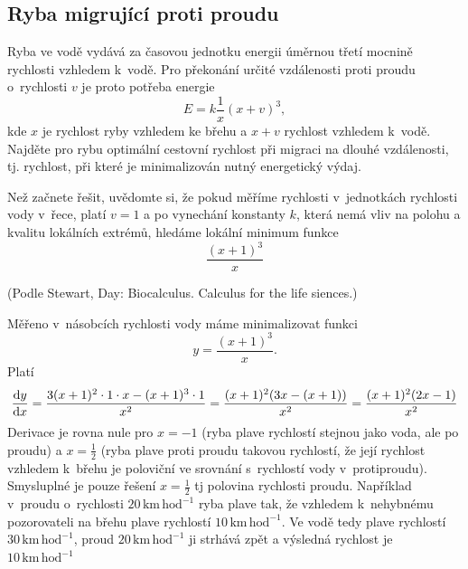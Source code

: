 {
\def\mezera{\vspace*{-20pt}}  \subsection{Ryba
  migrující proti proudu}  Ryba ve vodě vydává za časovou jednotku
energii úměrnou třetí mocnině rychlosti vzhledem k vodě. Pro překonání
určité vzdálenosti proti proudu o rychlosti $v$ je proto potřeba
energie $$E= k \frac 1x (x+v)^3,$$ kde $x$ je rychlost ryby vzhledem
ke břehu a $x+v$ rychlost vzhledem k vodě. Najděte pro rybu optimální
cestovní rychlost při migraci na dlouhé vzdálenosti, tj. rychlost, při
které je minimalizován nutný energetický výdaj.

{\footnotesize

Než začnete řešit, uvědomte si, že pokud měříme rychlosti v jednotkách rychlosti vody v řece, platí $v=1$ a po vynechání konstanty $k$, která nemá vliv na polohu a kvalitu lokálních extrémů, hledáme lokální minimum funkce
\begin{equation*}
  \frac{(x+1)^3}x
\end{equation*}

(Podle Stewart, Day: Biocalculus. Calculus for the life siences.)

}

\reseni
Měřeno v násobcích rychlosti vody máme minimalizovat funkci
\begin{equation*}
  y=\frac{(x+1)^3}x.
\end{equation*}
Platí
\begin{equation*}
  \frac{\mathrm{d}y}{\mathrm{d}x}=\frac{3(x+1)^2\cdot 1\cdot x-(x+1)^3\cdot 1}{x^2}=\frac{(x+1)^2(3x-(x+1))}{x^2}=\frac{(x+1)^2(2x-1)}{x^2}
\end{equation*}
Derivace je rovna nule pro $x=-1$ (ryba plave rychlostí stejnou jako voda, ale po proudu) a $x=\frac 12$ (ryba plave proti proudu takovou rychlostí, že její rychlost vzhledem k břehu je poloviční ve srovnání s rychlostí vody v protiproudu). Smysluplné je pouze řešení $x=\frac 12$ tj polovina rychlosti proudu. Například v proudu o rychlosti $20\,\mathrm{km}\,\mathrm{hod}^{-1}$ ryba plave tak, že vzhledem k nehybnému pozorovateli na břehu plave rychlostí $10\,\mathrm{km}\,\mathrm{hod}^{-1}$. Ve vodě tedy plave rychlostí $30\,\mathrm{km}\,\mathrm{hod}^{-1}$, proud $20\,\mathrm{km}\,\mathrm{hod}^{-1}$ ji strhává zpět a výsledná rychlost je $10\,\mathrm{km}\,\mathrm{hod}^{-1}$

\konec

}
\stranka

